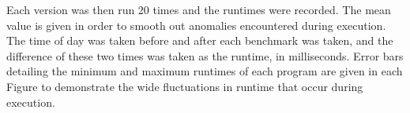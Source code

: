 Each version was then run 20 times and the runtimes were recorded. The mean value is given in order to smooth out anomalies encountered during execution. The time of day was taken before and after each benchmark was taken, and the difference of these two times was taken as the runtime, in milliseconds. Error bars detailing the minimum and maximum runtimes of each program are given in each Figure to demonstrate the wide fluctuations in runtime that occur during execution.
